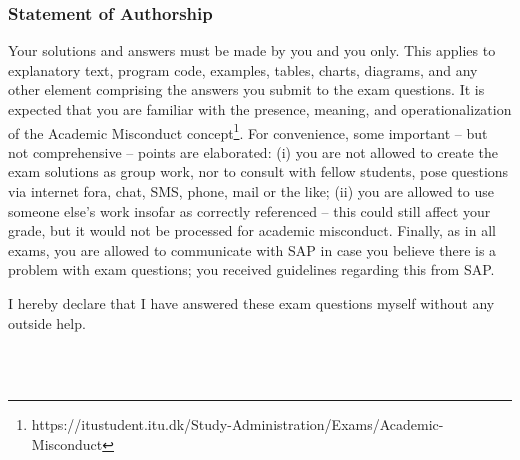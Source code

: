 
\subsubsection*{Statement of Authorship}
Your solutions and answers must be made by you and you only. 
This applies to 
explanatory text,
program code, 
examples, 
tables, 
charts, 
diagrams, and 
any other element comprising the answers you submit to the exam questions. 
It is expected that you are familiar with the presence, meaning, and operationalization of the Academic Misconduct concept\footnote{https://itustudent.itu.dk/Study-Administration/Exams/Academic-Misconduct}.
For convenience, some important -- but not comprehensive -- points are elaborated: 
(i) you are not allowed to create the exam solutions as group work, nor to consult with fellow students, pose questions via internet fora, chat, SMS, phone, mail or the like; 
(ii) you are allowed to use someone else's work insofar as correctly referenced -- this could still affect your grade, but it would not be processed for academic misconduct. 
Finally, as in all exams, you are allowed to communicate with SAP in case you believe there is a problem with exam questions; you received guidelines regarding this from SAP.

\vfill

\noindent I hereby declare that I have answered these exam questions myself without any outside help.%
\begin{flushright}
	\solutiondate \\
	\textbf{\solutionmyname} \\
	\end{flushright}